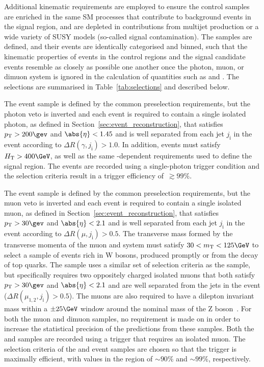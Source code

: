 Additional kinematic requirements are employed to ensure the control
samples are enriched in the same SM processes that contribute to
background events in the signal region, and are depleted in
contributions from multijet production or a wide variety of SUSY
models (\ie so-called signal contamination).  The samples are defined,
and their events are identically categorised and binned, such that the
kinematic properties of events in the control regions and the signal
candidate events resemble as closely as possible one another once the
photon, muon, or dimuon system is ignored in the calculation of
quantities such as \scalht and \HTmiss. The selections are summarised
in Table~\ref{tab:selections} and described below.

The \gj event sample is defined by the common preselection
requirements, but the photon veto is inverted and each event is
required to contain a single isolated photon, as defined in
Section~\ref{sec:event_reconstruction}, that satisfies $\Pt > 200\gev$
and $\abs{\eta} < 1.45$ and is well separated from each jet
$j_{\text{i}}$ in the event according to $\Delta
R(\gamma,j_{\text{i}}) > 1.0$. 
In addition, events must satisfy $\scalht > 400\GeV$, as well as the
same \scalht-dependent \alphat requirements used to define the signal
region. The events are recorded using a single-photon trigger
condition and the selection criteria result in a trigger efficiency
of~$\gtrsim 99\%$.

The \mj event sample is defined by the common preselection
requirements, but the muon veto is inverted and each event is required
to contain a single isolated muon, as defined in
Section~\ref{sec:event_reconstruction}, that satisfies $\Pt > 30\gev$
and $\abs{\eta} < 2.1$ and is well separated from each jet
$j_{\text{i}}$ in the event according to $\Delta R(\mu,j_{\text{i}}) >
0.5$.
The transverse mass formed by the transverse momenta of the muon and
\ptvecmiss system must satisfy $30 < m_\text{T} < 125\GeV$ to select a
sample of events rich in W bosons, produced promptly or from the decay
of top quarks. The \mmj sample uses a similar set of selection
criteria as the \mj sample, but specifically requires two oppositely
charged isolated muons that both satisfy $\Pt > 30\gev$ and
$\abs{\eta} < 2.1$ and are well separated from the jets in the event
($\Delta R(\mu_{1,2},j_{\text{i}}) > 0.5$). The muons are also
required to have a dilepton invariant mass within a $\pm 25\GeV$
window around the nominal mass of the Z
boson~\cite{1674-1137-38-9-090001}. For both the muon and dimuon
samples, no requirement is made on \alphat in order to increase the
statistical precision of the predictions from these samples. Both the
\mj and \mmj samples are recorded using a trigger that requires an
isolated muon. The selection criteria of the \mj and \mmj event
samples are chosen so that the trigger is maximally efficient, with
values in the region of $\sim 90\%$ and $\sim 99\%$, respectively.
